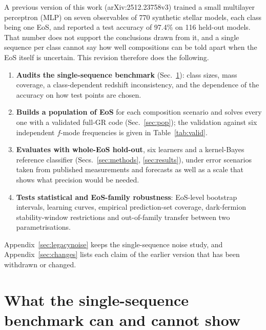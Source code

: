 \documentclass[11pt,a4paper]{article}
\begin{document}
A previous version of this work (arXiv:2512.23758v3) trained a small multilayer perceptron (MLP) on seven observables of 770 synthetic stellar models, each class being one EoS, and reported a test accuracy of 97.4\% on 116 held-out models. That number does not support the conclusions drawn from it, and a single sequence per class cannot say how well compositions can be told apart when the EoS itself is uncertain. This revision therefore does the following.
\begin{enumerate}
\item \textbf{Audits the single-sequence benchmark} (Sec.~\ref{sec:legacy}): class sizes, mass coverage, a class-dependent redshift inconsistency, and the dependence of the accuracy on how test points are chosen.
\item \textbf{Builds a population of EoS} for each composition scenario and solves every one with a validated full-GR code (Sec.~\ref{sec:pop}); the validation against six independent $f$-mode frequencies is given in Table~\ref{tab:valid}.
\item \textbf{Evaluates with whole-EoS hold-out}, six learners and a kernel-Bayes reference classifier (Secs.~\ref{sec:methods}, \ref{sec:results}), under error scenarios taken from published measurements and forecasts as well as a scale that shows what precision would be needed.
\item \textbf{Tests statistical and EoS-family robustness}: EoS-level bootstrap intervals, learning curves, empirical prediction-set coverage, dark-fermion stability-window restrictions and out-of-family transfer between two parametrisations.
\end{enumerate}
Appendix~\ref{sec:legacynoise} keeps the single-sequence noise study, and Appendix~\ref{sec:changes} lists each claim of the earlier version that has been withdrawn or changed.

\section{What the single-sequence benchmark can and cannot show}\label{sec:legacy}
\end{document}
